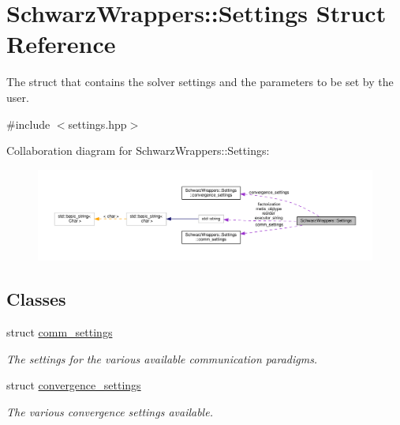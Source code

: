 \hypertarget{structSchwarzWrappers_1_1Settings}{}\section{Schwarz\+Wrappers\+:\+:Settings Struct Reference}
\label{structSchwarzWrappers_1_1Settings}


The struct that contains the solver settings and the parameters to be set by the user.  




{\ttfamily \#include $<$settings.\+hpp$>$}



Collaboration diagram for Schwarz\+Wrappers\+:\+:Settings\+:
\nopagebreak
\begin{figure}[H]
\begin{center}
\leavevmode
\includegraphics[width=350pt]{structSchwarzWrappers_1_1Settings__coll__graph}
\end{center}
\end{figure}
\subsection*{Classes}
\begin{DoxyCompactItemize}
\item 
struct \hyperlink{structSchwarzWrappers_1_1Settings_1_1comm__settings}{comm\+\_\+settings}
\begin{DoxyCompactList}\small\item\em The settings for the various available communication paradigms. \end{DoxyCompactList}\item 
struct \hyperlink{structSchwarzWrappers_1_1Settings_1_1convergence__settings}{convergence\+\_\+settings}
\begin{DoxyCompactList}\small\item\em The various convergence settings available. \end{DoxyCompactList}\end{DoxyCompactItemize}
